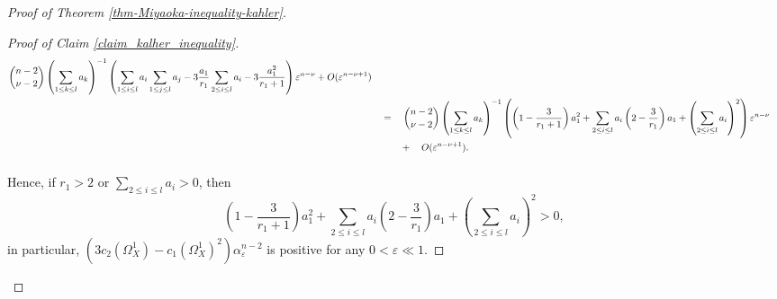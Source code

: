\documentclass[12pt]{amsart}
\theoremstyle{definition}
\theoremstyle{remark}
\numberwithin{equation}{section}
\newcommand{\underalign}[2]{\quad \underset{\mathclap{\strut #1}}{#2}\quad}
\begin{document}
\begin{proof}[Proof of Theorem \ref{thm-Miyaoka-inequality-kahler}]
\begin{proof}[Proof of Claim \ref{claim_kalher_inequality}]
\begin{align*}
\begin{split}
\binom{n-2}{\nu-2} \left(\sum_{1\le k\le l} a_k \right)^{-1}
\left(\sum_{1\le i\le l} a_i \sum_{1\le j\le l} a_j - 3 \frac{a_1}{r_1} \sum_{2\le i\le l}a_{i}- 3\frac{a_{1}^{2}}{r_1 + 1}\right)\varepsilon ^{n-\nu}
+ O( \varepsilon ^{n-\nu+1}) \\
& \underalign{}{=}
\binom{n-2}{\nu-2} \left(\sum_{1\le k\le l} a_k \right)^{-1}
\left( \left(1 - \frac{3}{r_1 + 1} \right) a_{1}^{2}
+ \sum_{2\le i\le l} a_i \left(2 - \frac{3}{r_1} \right) a_{1}
+\left(\sum_{2\le i\le l} a_i \right)^2 \right)\varepsilon ^{n-\nu}\\
& \quad\quad \underalign{}{+} O( \varepsilon ^{n-\nu+1}). \\
\end{split}
\end{align*}
Hence, if $r_1 >2$ or $\sum_{2\le i\le l} a_i >0$, then 
$$
\left(1 - \frac{3}{r_1 + 1} \right) a_{1}^{2}
+ \sum_{2\le i\le l} a_i \left(2 - \frac{3}{r_1} \right) a_{1}
+\left(\sum_{2\le i\le l} a_i \right)^2  >0, 
$$
in particular, $\left(3c_2(\Omega_{X}^{1}) -  c_1(\Omega_{X}^{1})^2 \right)\alpha_{ \varepsilon }^{n-2} $ is positive for any $0 < \varepsilon \ll 1$.
\end{proof}


\end{proof}
\end{document}
